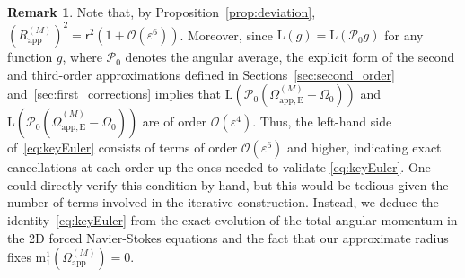 \documentclass[11pt,reqno,a4paper]{amsart}
\def\eps{\varepsilon}
\newcommand{\cO}{\mathcal{O}}
\newcommand{\cP}{\mathcal{P}}
\newcommand{\mrm}{\mathrm{m}}
\newcommand{\1}{\mathbbm{1}}
\theoremstyle{definition}
\newtheorem{remark}[proposition]{Remark}
\theoremstyle{definition}
\numberwithin{equation}{section}
\begin{document}
\begin{remark}
Note that, by Proposition~\ref{prop:deviation}, $(R_{\mathrm{app}}^{(M)})^2 = \mathsf{r}^2(1+\cO(\eps^6))$. Moreover, since $\mathrm{L}(g) = \mathrm{L}(\cP_0 g)$ for any function $g$, where $\cP_0$ denotes the angular average, the explicit form of the second and third-order approximations defined in Sections~\ref{sec:second_order} and~\ref{sec:first_corrections} implies that $\mathrm{L}(\cP_0(\Omega^{(M)}_{\mathrm{app,E}}-\Omega_0))$ and $\mathrm{L}(\cP_0(\widehat{\Omega}^{(M)}_{\mathrm{app,E}}-\Omega_0))$ are of order $\cO(\eps^4)$. Thus, the left-hand side of~\cref{eq:keyEuler} consists of terms of order $\cO(\eps^6)$ and higher, indicating exact cancellations at each order up the ones needed to validate \cref{eq:keyEuler}. One could directly verify this condition by hand, but this would be  tedious given the number of terms involved in the iterative construction. Instead, we deduce the identity~\cref{eq:keyEuler} from the exact evolution of the total angular momentum in the 2D forced Navier-Stokes equations and the fact that our approximate radius fixes $\mrm^1_1(\Omega_{\mathrm{app}}^{(M)}) = 0$.
\end{remark}
\end{document}
